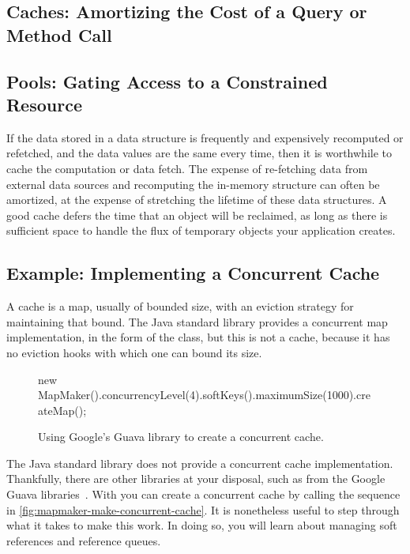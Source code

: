 \subsection{Caches: Amortizing the Cost of a Query or Method Call}

\subsection{Pools: Gating Access to a Constrained Resource}

If the data stored in a data structure is frequently and expensively recomputed
or refetched, and the data values are the same every time, then it is worthwhile
to cache the computation or data fetch. The expense of re-fetching data from
external data sources and recomputing the in-memory structure can often be
amortized, at the expense of stretching the lifetime of these data structures. A
good cache defers the time that an object will be reclaimed, as long as there is
sufficient space to handle the flux of temporary objects your application
creates.

\subsection{Example: Implementing a Concurrent Cache}
\label{sec:lifetime-management-concurrency-issues}

A cache is a map, usually of bounded size, with an eviction strategy for
maintaining that bound. The Java standard library provides a
concurrent map implementation, in the form of the 
class, but this is not a cache, because it has no eviction hooks with which one
can bound its size.

\begin{wrapfigure}[9]{r}{0.34\textwidth}
\centering
\begin{framedlisting}
new MapMaker().concurrencyLevel(4).softKeys().maximumSize(1000).createMap();
\end{framedlisting}
\caption{Using Google's Guava library to create a concurrent cache.}
\label{fig:mapmaker-make-concurrent-cache}
\end{wrapfigure}
The Java standard library does not provide a concurrent cache implementation.
Thankfully, there are other libraries at your disposal, such as 
from the Google Guava libraries~\cite{google-guava}. With  you can create
a concurrent cache by calling the sequence in
\autoref{fig:mapmaker-make-concurrent-cache}. It is nonetheless useful to step
through what it takes to make this work. In doing so, you will learn about
managing soft references and reference queues.

